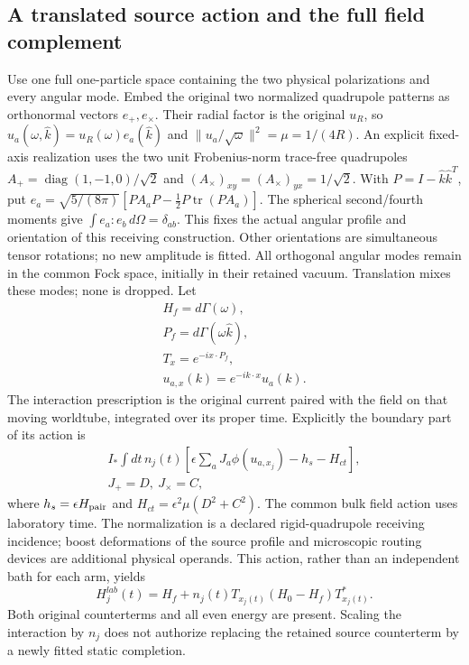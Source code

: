 \subsection{A translated source action and the full field complement}
Use one full one-particle space containing the two physical polarizations
and every angular mode. Embed the original two normalized quadrupole
patterns as orthonormal vectors \(e_+,e_\times\). Their radial factor is
the original \(u_R\), so \(u_a(\omega,\widehat k)=u_R(\omega)e_a(\widehat k)\)
and \(\|u_a/\sqrt\omega\|^2=\mu=1/(4R)\).
An explicit fixed-axis realization uses the two unit Frobenius-norm
trace-free quadrupoles \(A_+=\operatorname{diag}(1,-1,0)/\sqrt2\)
and \((A_\times)_{xy}=(A_\times)_{yx}=1/\sqrt2\).
With \(P=I-\widehat k\widehat k^T\), put
\(e_a=\sqrt{5/(8\pi)}[PA_aP-\tfrac12P\operatorname{tr}(PA_a)]\).
The spherical second/fourth moments give
\(\int e_a:e_b\,d\Omega=\delta_{ab}\). This fixes the actual angular
profile and orientation of this receiving construction. Other orientations
are simultaneous tensor rotations; no new amplitude is fitted.
All orthogonal angular modes remain in the common Fock space, initially
in their retained vacuum. Translation mixes these modes; none is dropped.
Let
\[\begin{gathered}
H_f=d\Gamma(\omega),\\
 P_f=d\Gamma(\omega\widehat k),\\
 T_x=e^{-ix\cdot P_f},\\
 u_{a,x}(k)=e^{-ik\cdot x}u_a(k).
\end{gathered}\]
The interaction prescription is the original current paired with the
field on that moving worldtube, integrated over its proper time. Explicitly
the boundary part of its action is
\[\begin{gathered}
I_*\int dt\,n_j(t)\left[
 \epsilon\sum_a J_a\phi(u_{a,x_j})-h_s-H_{ct}\right],\\
 J_+=D,\ J_\times=C,
\end{gathered}\]
where \(h_s=\epsilon H_{\rm pair}\) and
\(H_{ct}=\epsilon^2\mu(D^2+C^2)\). The common bulk field action uses
laboratory time. The normalization is a declared rigid-quadrupole receiving
incidence; boost deformations of the source profile and microscopic routing
devices are additional physical operands. This action, rather than an
independent bath for each arm, yields
\begin{equation}
 H_j^{lab}(t)=H_f+n_j(t)T_{x_j(t)}(H_0-H_f)T_{x_j(t)}^* .
 \label{eq:new-lab-generator}
\end{equation}
Both original counterterms and all even energy are present. Scaling the
interaction by \(n_j\) does not authorize replacing the retained source
counterterm by a newly fitted static completion.

